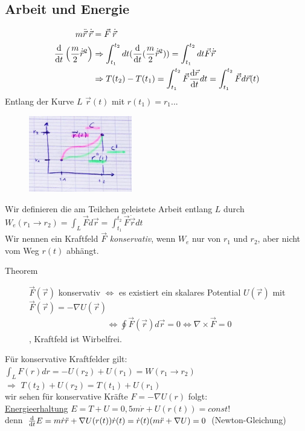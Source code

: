 \subsection{Arbeit und Energie}
\begin{align*}
  m\ddot{\vec{r}}\:\dot{\vec{r}}&= \vec{F}\:\dot{\vec{r}}\\
  \frac{\text{d} }{\text{d} t} \left( \frac{m}{2} \dot{\vec{r}}^2 \right)
  &\Rightarrow\int_{t_1}^{t_2}dt(\frac{\text{d} }{\text{d} t}(\frac{m}{2} \dot{\vec{r}}^2))
  = \int_{t_1}^{t_2}dt\vec{F}\dot{\vec{r}}\\
  &\Rightarrow T(t_2)-T(t_1) = \int_{t_1}^{t_2}\vec{F}\frac{\text{d} \vec{r}}{\text{d} t}dt
  = \int_{t_1}^{t_2}\vec{F}d\vec{r}(t)
\end{align*}
Entlang der Kurve $L$ $\vec{r}(t)$ mit $r(t_1)=r_1...$
\begin{figure}[h]
\begin{center}
\includegraphics[width=0.4\textwidth]{Skizzen/Anhang2.jpg}
\end{center}
\caption{}
\end{figure}
Wir definieren die am Teilchen geleistete Arbeit entlang $L$ durch $W_e(r_1\rightarrow r_2)=\int_L \vec{F}d\vec{r}=\int_{t_1}^{t_2}\vec{F}\dot{\vec{r}}dt$\\
Wir nennen ein Kraftfeld $\vec{F}$ \emph{konservativ}, wenn $W_e$ nur von $r_1$ und $r_2$, aber nicht vom Weg $r(t)$ abhängt.\\
\begin{description}
\item[Theorem] $\vec{F}(\vec{r})$ konservativ $\Leftrightarrow$ es existiert ein skalares Potential $U(\vec{r})$ mit $\vec{F}(\vec{r})=-\nabla U(\vec{r})$
\begin{align*}
\Leftrightarrow \oint\vec{F}(\vec{r})d\vec{r}=0 \Leftrightarrow\nabla \times\vec{F}=0
\end{align*}
, Kraftfeld ist Wirbelfrei.
\end{description}
Für konservative Kraftfelder gilt: $\int_L F(r)dr=-U(r_2)+U(r_1)=W(r_1\rightarrow r_2)$\\
$\Rightarrow$ $T(t_2)+U(r_2)=T(t_1)+U(r_1)$\\
wir sehen für konservative Kräfte $F=-\nabla U(r)$ folgt:\\
\underline{Energieerhaltung} $E=T+U=0,5m\dot{r}+U(r(t))=const$!\\
denn $\frac{\text{d} }{\text{d} t}E=m\dot{r}\ddot{r}+\nabla U(r(t))\dot{r}(t)=\dot{r}(t)(m\ddot{r}+\nabla U)=0$ (Newton-Gleichung)


